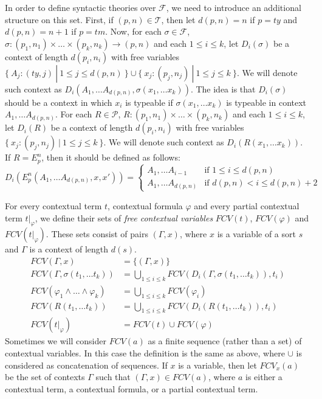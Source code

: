 \documentclass[reqno]{amsart}
\theoremstyle{definition}
\theoremstyle{remark}
\numberwithin{figure}{section}
\begin{document}
In order to define syntactic theories over $\mathcal{F}$, we need to introduce an additional structure on this set.
First, if $(p,n) \in \mathcal{T}$, then let $d(p,n) = n$ if $p = ty$ and $d(p,n) = n+1$ if $p = tm$.
Now, for each $\sigma \in \mathcal{F}$, $\sigma : (p_1,n_1) \times \ldots \times (p_k,n_k) \to (p,n)$ and each $1 \leq i \leq k$,
let $D_i(\sigma)$ be a context of length $d(p_i,n_i)$ with free variables $\{\ A_j : (ty,j)\ |\ 1 \leq j \leq d(p,n)\ \} \cup \{\ x_j : (p_j,n_j)\ |\ 1 \leq j \leq k\ \}$.
We will denote such context as $D_i(A_1, \ldots A_{d(p,n)}, \sigma(x_1, \ldots x_k))$.
The idea is that $D_i(\sigma)$ should be a context in which $x_i$ is typeable if $\sigma(x_1, \ldots x_k)$ is typeable in context $A_1, \ldots A_{d(p,n)}$.
For each $R \in \mathcal{P}$, $R : (p_1,n_1) \times \ldots \times (p_k,n_k)$ and each $1 \leq i \leq k$,
let $D_i(R)$ be a context of length $d(p_i,n_i)$ with free variables $\{\ x_j : (p_j,n_j)\ |\ 1 \leq j \leq k\ \}$.
We will denote such context as $D_i(R(x_1, \ldots x_k))$.
If $R = E^n_p$, then it should be defined as follows:
\[ D_i(E^n_p(A_1, \ldots A_{d(p,n)}, x, x')) =
  \begin{cases}
      A_1, \ldots A_{i-1} & \text{if } 1 \leq i \leq d(p,n) \\
      A_1, \ldots A_{d(p,n)} & \text{if } d(p,n) < i \leq d(p,n) + 2
  \end{cases}
\]

For every contextual term $t$, contextual formula $\varphi$ and every partial contextual term $t|_\varphi$,
we define their sets of \emph{free contextual variables} $FCV(t)$, $FCV(\varphi)$ and $FCV(t|_\varphi)$.
These sets consist of pairs $(\Gamma,x)$, where $x$ is a variable of a sort $s$ and $\Gamma$ is a context of length $d(s)$.
\begin{align*}
FCV(\Gamma,x) & = \{ (\Gamma,x) \} \\
FCV(\Gamma, \sigma(t_1, \ldots t_k)) & = \bigcup_{1 \leq i \leq k} FCV(D_i(\Gamma,\sigma(t_1, \ldots t_k)), t_i) \\
FCV(\varphi_1 \land \ldots \land \varphi_k) & = \bigcup_{1 \leq i \leq k} FCV(\varphi_i) \\
FCV(R(t_1, \ldots t_k)) & = \bigcup_{1 \leq i \leq k} FCV(D_i(R(t_1, \ldots t_k)), t_i) \\
FCV(t|_\varphi) & = FCV(t) \cup FCV(\varphi)
\end{align*}
Sometimes we will consider $FCV(a)$ as a finite sequence (rather than a set) of contextual variables.
In this case the definition is the same as above, where $\cup$ is considered as concatenation of sequences.
If $x$ is a variable, then let $FCV_x(a)$ be the set of contexts $\Gamma$ such that $(\Gamma,x) \in FCV(a)$,
where $a$ is either a contextual term, a contextual formula, or a partial contextual term.
\end{document}
